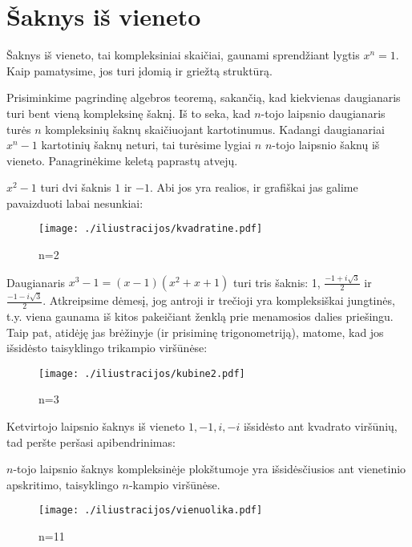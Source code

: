 \section{Šaknys iš vieneto}

Šaknys iš vieneto, tai kompleksiniai skaičiai, gaunami sprendžiant lygtis $x^n = 1$. Kaip pamatysime, jos turi įdomią ir griežtą struktūrą.

Prisiminkime pagrindinę algebros teoremą, sakančią, kad kiekvienas daugianaris turi bent vieną kompleksinę šaknį. Iš to seka, kad $n$-tojo laipsnio daugianaris turės $n$ kompleksinių šaknų skaičiuojant kartotinumus. Kadangi daugianariai $x^n - 1$ kartotinių šaknų neturi, tai turėsime lygiai $n$ $n$-tojo laipsnio šaknų iš vieneto. Panagrinėkime keletą paprastų atvejų.

$x^2 - 1$ turi dvi šaknis $1$ ir $-1$. Abi jos yra realios, ir grafiškai jas galime pavaizduoti labai nesunkiai:
\begin{figure}[h!]
  \begin{center}
    \texttt{[image: ./iliustracijos/kvadratine.pdf]}
  \end{center}
  \caption{n=2}
\end{figure}

Daugianaris $x^3 - 1 = (x-1)(x^2 + x + 1)$ turi tris šaknis: 1, $\frac{-1 + i \sqrt{3}}{2}$ ir $\frac{-1 - i \sqrt{3}}{2}$. Atkreipsime dėmesį, jog antroji ir trečioji yra kompleksiškai jungtinės, t.y. viena gaunama iš kitos pakeičiant ženklą prie menamosios dalies priešingu. Taip pat, atidėję jas brėžinyje (ir prisiminę trigonometriją), matome, kad jos išsidėsto taisyklingo trikampio viršūnėse:

\begin{figure}[h!]
  \begin{center}
    \texttt{[image: ./iliustracijos/kubine2.pdf]}
  \end{center}
  \caption{n=3}
\end{figure}

\bigskip \bigskip

Ketvirtojo laipsnio šaknys iš vieneto $1, -1, i, -i$ išsidėsto ant kvadrato viršūnių, tad peršte peršasi apibendrinimas:

\begin{teig} $n$-tojo laipsnio šaknys kompleksinėje plokštumoje yra išsidėsčiusios ant vienetinio apskritimo, taisyklingo $n$-kampio viršūnėse. 
\end{teig}

\begin{figure}[h!]
  \begin{center}
    \texttt{[image: ./iliustracijos/vienuolika.pdf]}
  \end{center}
  \caption{n=11}
\end{figure}


